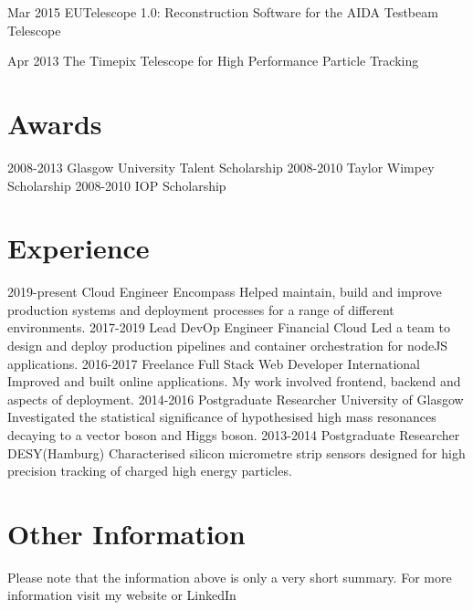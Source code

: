 \documentclass[]{twentysecondcv}
\begin{document}
\begin{twentyshort}
  \twentyitemshort
    {Mar 2015}
    {EUTelescope 1.0: Reconstruction Software for the AIDA Testbeam Telescope}
\end{twentyshort}

\begin{twentyshort}
  \twentyitemshort
    {Apr 2013}
    {The Timepix Telescope for High Performance Particle Tracking}
\end{twentyshort}



\section*{Awards}

\begin{twentyshort}
  \twentyitemshort
    {2008-2013}
    {Glasgow University Talent Scholarship}
  \twentyitemshort
    {2008-2010}
    {Taylor Wimpey Scholarship}
  \twentyitemshort
    {2008-2010}
    {IOP Scholarship}
\end{twentyshort}


\section*{Experience}

\begin{twenty}
  \twentyitem
  {2019-present}
  {Cloud Engineer}
  {Encompass}
  {Helped maintain, build and improve production systems and deployment processes for a range of different environments.}
  \twentyitem
  {2017-2019}
  {Lead DevOp Engineer}
  {Financial Cloud}
  {Led a team to design and deploy production pipelines and container orchestration for nodeJS applications.}
  \twentyitem
    {2016-2017}
    {Freelance Full Stack Web Developer}
    {International}
    {Improved and built online applications. My work involved frontend, backend and aspects of deployment.}
  \twentyitem
    {2014-2016}
    {Postgraduate Researcher}
    {University of Glasgow}
    {Investigated the statistical significance of hypothesised high mass resonances decaying to a vector boson and Higgs boson.}
\twentyitem
    {2013-2014}
    {Postgraduate Researcher}
		{DESY(Hamburg)}
    {Characterised silicon micrometre strip sensors designed for high precision tracking of charged high energy particles.}

\end{twenty}
\section*{Other Information}
\hspace*{5pt}
Please note that the information above is only a very short summary. For more information visit my website or LinkedIn
\hspace*{5pt}
\vspace*{2pt}

\end{document}
